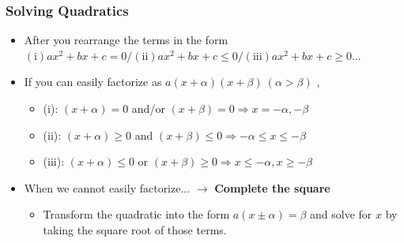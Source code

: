 \documentclass[pdflatex, 12pt]{beamer}
\begin{document}
\begin{frame}
\frametitle{Solving Quadratics}
\begin{itemize}
\item After you rearrange the terms in the form $\mathrm{(i)} ax^2 + bx + c = 0 /\mathrm{(ii)} ax^2 + bx + c \leq 0 /\mathrm{(iii)} ax^2 + bx + c \geq 0$...
\vspace{0.4cm}
\item If you can easily factorize as $a(x + \alpha)(x + \beta)\ (\alpha > \beta)$ ,
 \begin{itemize}
 \item (i): $(x + \alpha) = 0$ and/or $(x + \beta) = 0 \Rightarrow x = -\alpha, -\beta$
 \item (ii): $(x + \alpha) \geq 0$ and  $(x + \beta) \leq 0 \Rightarrow -\alpha \leq x \leq -\beta$
 \item (iii): $(x + \alpha) \leq 0$ or $(x + \beta) \geq 0 \Rightarrow x \leq -\alpha, x \geq -\beta$
 \end{itemize}
\vspace{0.4cm}
\item When we cannot easily factorize... $\rightarrow$ \textbf{Complete the square}
 \begin{itemize}
 \item Transform the quadratic into the form $a(x \pm \alpha) = \beta$ and solve for $x$ by taking the square root of those terms.
 \end{itemize}
\end{itemize}
\end{frame}
\end{document}
